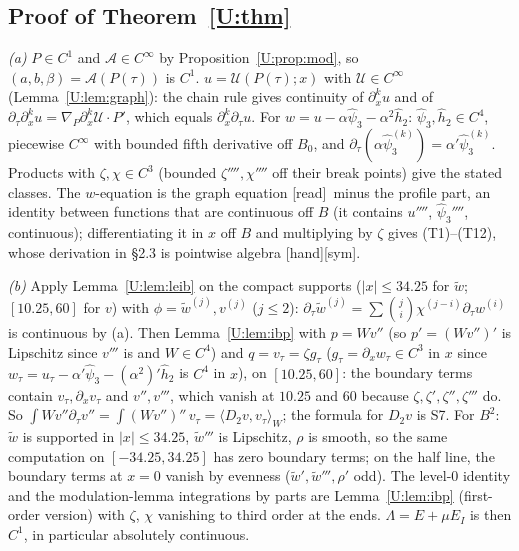 \documentclass[11pt]{article}
\newcommand{\fn}[1]{\texttt{\detokenize{#1}}}
\newcommand{\tH}{\textup{[hand]}}\newcommand{\tS}{\textup{[sym]}}\newcommand{\tR}{\textup{[read]}}\newcommand{\tL}{\textup{[Lean]}}\newcommand{\tD}{\textup{[DKS]}}\newcommand{\tI}{\textup{[inh]}}
\newcommand{\ip}[2]{\langle#1,#2\rangle}
\begin{document}
\subsection{Proof of Theorem~\ref{U:thm}}
\emph{(a)} $P\in C^1$ and $\mathcal A\in C^\infty$ by Proposition~\ref{U:prop:mod}, so $(a,b,\beta)=\mathcal A(P(\tau))$ is $C^1$. $u=\mathcal U(P(\tau);x)$ with $\mathcal U\in C^\infty$ (Lemma~\ref{U:lem:graph}): the chain rule gives continuity of $\partial_x^ku$ and of $\partial_\tau\partial_x^ku=\nabla_P\partial_x^k\mathcal U\cdot P'$, which equals $\partial_x^k\partial_\tau u$. For $w=u-\alpha\hat\psi_3-\alpha^2\hat h_2$: $\hat\psi_3,\hat h_2\in C^4$, piecewise $C^\infty$ with bounded fifth derivative off $B_0$, and $\partial_\tau(\alpha\hat\psi_3^{(k)})=\alpha'\hat\psi_3^{(k)}$. Products with $\zeta,\chi\in C^3$ (bounded $\zeta'''',\chi''''$ off their break points) give the stated classes. The $w$-equation is the graph equation \tR\ minus the profile part, an identity between functions that are continuous off $B$ (it contains $u''''$, $\hat\psi_3''''$, continuous); differentiating it in $x$ off $B$ and multiplying by $\zeta$ gives (T1)--(T12), whose derivation in \fn{EI_SPEC.md} \S2.3 is pointwise algebra \tH\tS.

\emph{(b)} Apply Lemma~\ref{U:lem:leib} on the compact supports ($|x|\le34.25$ for $\tilde w$; $[10.25,60]$ for $v$) with $\phi=\tilde w^{(j)},v^{(j)}$ ($j\le2$): $\partial_\tau\tilde w^{(j)}=\sum\binom ji\chi^{(j-i)}\partial_\tau w^{(i)}$ is continuous by (a). Then Lemma~\ref{U:lem:ibp} with $p=Wv''$ (so $p'=(Wv'')'$ is Lipschitz since $v'''$ is and $W\in C^4$) and $q=v_\tau=\zeta g_\tau$ ($g_\tau=\partial_xw_\tau\in C^3$ in $x$ since $w_\tau=u_\tau-\alpha'\hat\psi_3-(\alpha^2)'\hat h_2$ is $C^4$ in $x$), on $[10.25,60]$: the boundary terms contain $v_\tau,\partial_xv_\tau$ and $v'',v'''$, which vanish at $10.25$ and $60$ because $\zeta,\zeta',\zeta'',\zeta'''$ do. So $\int Wv''\partial_\tau v''=\int(Wv'')''\,v_\tau=\ip{D_2v}{v_\tau}_W$; the formula for $D_2v$ is S7. For $B^2$: $\tilde w$ is supported in $|x|\le34.25$, $\tilde w'''$ is Lipschitz, $\rho$ is smooth, so the same computation on $[-34.25,34.25]$ has zero boundary terms; on the half line, the boundary terms at $x=0$ vanish by evenness ($\tilde w',\tilde w''',\rho'$ odd). The level-0 identity and the modulation-lemma integrations by parts are Lemma~\ref{U:lem:ibp} (first-order version) with $\zeta$, $\chi$ vanishing to third order at the ends. $\Lambda=E+\mu E_I$ is then $C^1$, in particular absolutely continuous.
\end{document}

